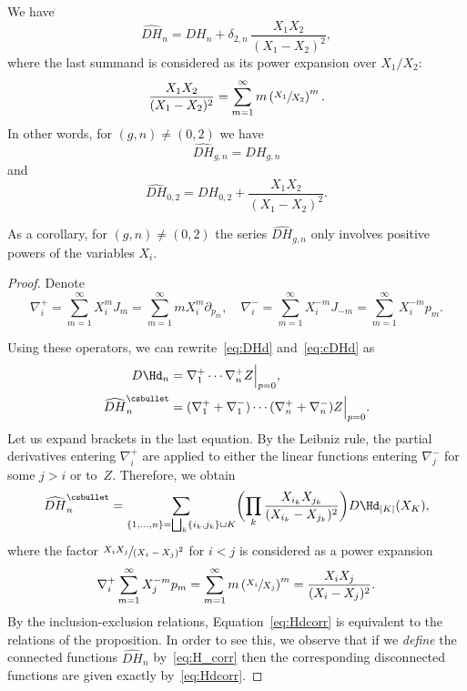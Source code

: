 \begin{proposition}\label{prop:H_corr}
We have
\begin{equation}\label{eq:H_corr}
\widehat{DH}_n=DH_n+\delta_{2,n}\,\frac{X_1X_2}{(X_1-X_2)^2},
\end{equation}
where the last summand is considered as its power expansion over $X_1/X_2$:
\begin{equation*}
\frac{X_1X_2}{(X_1-X_2)^2}=\sum_{m=1}^\infty m\left(\sfrac{X_1}{X_2}\right)^m.
\end{equation*}
In other words, for $(g,n)\ne(0,2)$ we have
\begin{equation*}
\widehat{D H}_{g,n}=DH_{g,n}
\end{equation*}
and
\begin{equation}\label{eq:DH02}
\widehat{D H}_{0,2}=DH_{0,2}+\frac{X_1X_2}{(X_1-X_2)^2}.
\end{equation}

As a corollary, for $(g,n)\ne(0,2)$ the series $\widehat{D H}_{g,n}$ only involves positive powers of the variables $X_i$.
\end{proposition}

\begin{proof}
Denote
\begin{equation*}
\nabla^+_i=\sum_{m=1}^\infty X_i^m J_m=\sum_{m=1}^\infty m X_i^m \partial_{p_m},\quad
\nabla^-_i=\sum_{m=1}^\infty X_i^{-m} J_{-m}=\sum_{m=1}^\infty X_i^{-m} p_m.
\end{equation*}

Using these operators, we can rewrite~\eqref{eq:DHd} and~\eqref{eq:cDHd} as
\begin{align*}
D\Hd_n&=
\nabla_1^+\cdots \nabla_n^+Z\Big|_{p=0},\\
\widehat{DH}^\csbullet_n&=
(\nabla_1^++\nabla_1^-)\cdots (\nabla_n^++\nabla_n^-)Z\Big|_{p=0}.
\end{align*}
Let us expand brackets in the last equation. By the Leibniz rule, the partial derivatives entering $\nabla_i^+$ are applied to either the linear functions entering $\nabla_j^-$ for some $j>i$ or to~$Z$. Therefore, we obtain
\begin{equation}\label{eq:Hdcorr}
\widehat{DH}^\csbullet_n=
\sum_{\{1,\dots,n\}=\bigsqcup_k\{i_k,j_k\}\sqcup K}\biggl(\prod_k\frac{X_{i_k}X_{j_k}}{(X_{i_k}-X_{j_k})^2}\biggr)D\Hd_{|K|}(X_K),
\end{equation}
where the factor $\sfrac{X_iX_j}{(X_i-X_j)^2}$ for $i<j$ is considered as a power expansion
\begin{equation*}
\nabla^+_i\sum_{m=1}^\infty X_j^{-m} p_m
=\sum_{m=1}^\infty m\left(\sfrac{X_i}{X_j}\right)^m
=\frac{X_iX_j}{(X_i-X_j)^2}.
\end{equation*}
By the inclusion-exclusion relations, Equation~\eqref{eq:Hdcorr} is equivalent to the relations of the proposition. In order to see this, we observe that if we \emph{define} the connected functions $\widehat{DH}_n$ by~\eqref{eq:H_corr}
then the corresponding disconnected functions are given exactly by~\eqref{eq:Hdcorr}.
\end{proof}

